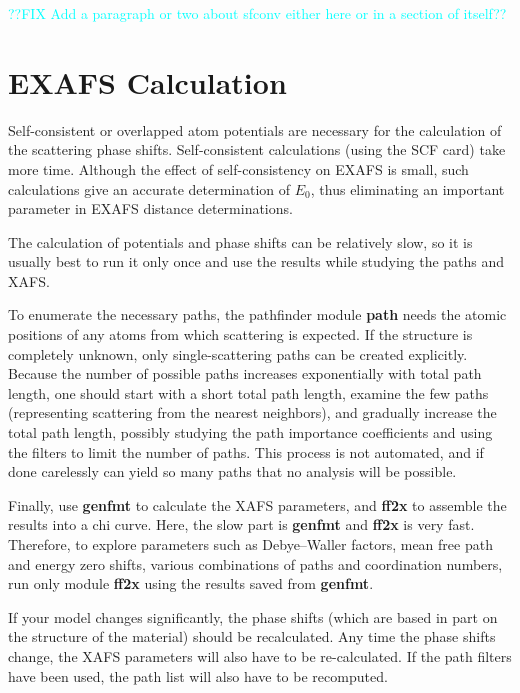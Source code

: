 \documentclass[11pt,oneside]{report} %
\newcommand{\module}[1]{\textrm{\bf{#1}}}
\begin{document}
\textcolor{cyan}{??FIX Add a paragraph or two about sfconv either here or in a section of itself??}


\section{EXAFS Calculation}
\label{sec:EXAFS-calculation}
Self-consistent or overlapped atom potentials are necessary
for the calculation of the scattering phase shifts. Self-consistent
calculations (using the SCF card) take more time. 
Although the effect of self-consistency on EXAFS is small,
such calculations give an accurate determination of $E_0$,
thus eliminating an important parameter in EXAFS
distance determinations.

The calculation of potentials and phase shifts can be relatively slow, so it is usually best to run
it only once and use the results while studying the paths and XAFS.

To enumerate the necessary paths, the pathfinder module \module{path} needs the
atomic positions of any atoms from which scattering is expected. If
the structure is completely unknown, only single-scattering paths can be
created explicitly. Because the number of possible paths increases
exponentially with total path length, one should start with a short total path
length, examine the few paths (representing scattering from the nearest
neighbors), and gradually increase the total path length, possibly
studying the path importance coefficients and using the filters to
limit the number of paths. This process is not automated, and if done
carelessly can yield so many paths that no analysis will be possible.

Finally, use \module{genfmt} to calculate the XAFS parameters, and \module{ff2x} to
assemble the results into a chi curve. Here, the slow part is \module{genfmt}
and \module{ff2x} is very fast. Therefore, to explore parameters such as
Debye--Waller factors, mean free path and energy zero shifts, various
combinations of paths and coordination numbers, run only module \module{ff2x}
using the results saved from \module{genfmt}.

If your model changes significantly, the phase shifts (which are based
in part on the structure of the material) should be recalculated.
Any time the phase shifts change, the XAFS parameters will also have to be
re-calculated. If the path filters have been used, the path list will
also have to be recomputed.
\end{document}
